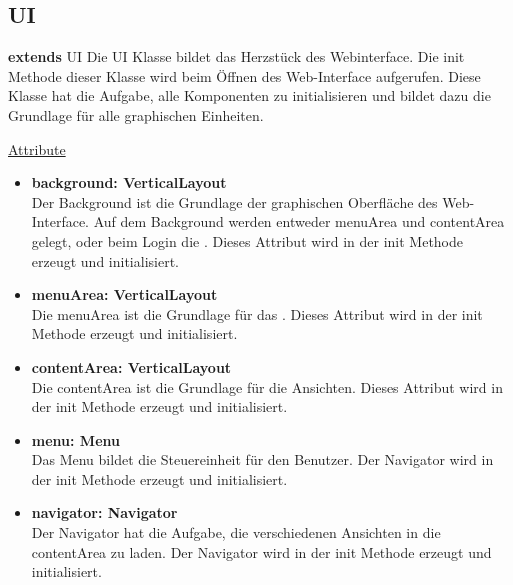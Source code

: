 \newpage
\subsection{UI}\label{UI}
\textbf{extends}  UI \newline
Die UI Klasse bildet das Herzstück des Webinterface. Die init Methode dieser Klasse wird beim Öffnen des Web-Interface aufgerufen. Diese Klasse hat die Aufgabe, alle Komponenten zu initialisieren und bildet dazu die Grundlage für alle graphischen Einheiten.
\newline

\underline{Attribute}
\begin{itemize}
\itemsep0pt

\item \textbf{background: VerticalLayout} \hfill\\ 
Der Background ist die Grundlage der graphischen Oberfläche des Web-Interface. Auf dem Background werden entweder menuArea und contentArea gelegt, oder beim Login die . Dieses Attribut wird in der init Methode erzeugt und initialisiert.

\item \textbf{menuArea: VerticalLayout} \hfill\\ 
Die menuArea ist die Grundlage für das . Dieses Attribut wird in der init Methode erzeugt und initialisiert.

\item \textbf{contentArea: VerticalLayout} \hfill\\ 
Die contentArea ist die Grundlage für die Ansichten. Dieses Attribut wird in der init Methode erzeugt und initialisiert.

\item \textbf{menu: Menu} \hfill\\ 
Das Menu bildet die Steuereinheit für den Benutzer. Der Navigator wird in der init Methode erzeugt und initialisiert.

\item \textbf{navigator: Navigator} \hfill\\ 
Der Navigator hat die Aufgabe, die verschiedenen Ansichten in die contentArea zu laden. Der Navigator wird in der init Methode erzeugt und initialisiert.

\end{itemize}

